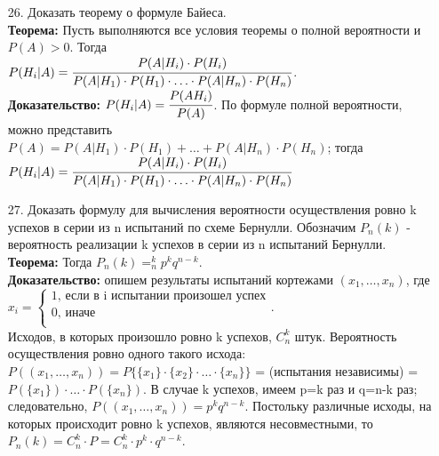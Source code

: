 \documentclass[a4paper]{article}
\begin{document}
\begin{enumerate}
\item[26.] Доказать теорему о формуле Байеса. \\
\textbf{Теорема:} Пусть выполняются все условия теоремы о полной вероятности и $P(A) > 0$. Тогда \\
$P(H_i|A) = \cfrac{P(A|H_i) \cdot P(H_i)}{P(A|H_1) \cdot P(H_1) \cdot \ldots \cdot P(A|H_n) \cdot P(H_n)}$. \\
\textbf{Доказательство:} $P(H_i|A) = \cfrac{P(AH_i)}{P(A)}$. По формуле полной вероятности, можно представить $P(A) = P(A|H_1) \cdot P(H_1) + \ldots + P(A|H_n) \cdot P(H_n)$; тогда $P(H_i|A) = \cfrac{P(A|H_i) \cdot P(H_i)}{P(A|H_1) \cdot P(H_1) \cdot \ldots \cdot P(A|H_n) \cdot P(H_n)}$



\item[27.] Доказать формулу для вычисления вероятности осуществления ровно k успехов в серии из n испытаний по схеме Бернулли.
Обозначим $P_n(k)$ - вероятность реализации k успехов в серии из n испытаний Бернулли. \\
\textbf{Теорема:} Тогда $P_n(k) = ^k_n p^k q^{n-k}$. \\
\textbf{Доказательство:} опишем результаты испытаний кортежами $(x_1, \ldots, x_n)$, где \\
$x_i =
\begin{cases}
	\text{1, если в i испытании произошел успех} \\
	\text{0, иначе} \\
\end{cases}$. \\
Исходов, в которых произошло ровно k успехов, $C^k_n$ штук. Вероятность осуществления ровно одного такого исхода: $P((x_1, \ldots , x_n)) = P\{ \{x_1\} \cdot \{x_2\} \cdot \ldots \cdot \{x_n\} \}$ = (испытания независимы) = $P(\{x_1\}) \cdot \ldots \cdot P(\{x_n\})$. В случае k успехов, имеем p=k раз и q=n-k раз; следовательно, $P((x_1, \ldots, x_n)) = p^k q^{n-k}$. Постольку различные исходы, на которых происходит ровно k успехов, являются несовместными, то $P_n(k) = C^k_n \cdot P = C^k_n \cdot p^k \cdot q^{n-k}$.
\end{enumerate}
\end{document}
